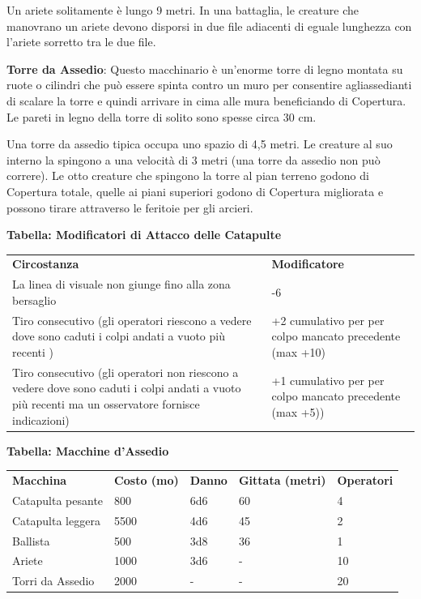 \documentclass[a4paper,11pt,twoside,openany]{book}
\begin{document}
{Un ariete solitamente è lungo 9 metri. In una battaglia, le creature che manovrano un ariete devono disporsi in due file adiacenti di eguale lunghezza con l'ariete sorretto tra le due file. 

\textbf{Torre da Assedio}: Questo macchinario è un'enorme torre di legno montata su ruote o cilindri che può essere spinta contro un muro per consentire agliassedianti di scalare la torre e quindi arrivare in cima alle mura beneficiando di Copertura. Le pareti in legno della torre di solito sono spesse circa 30 cm.

Una torre da assedio tipica occupa uno spazio di 4,5 metri. Le creature al suo interno la spingono a una velocità di 3 metri (una torre da assedio non può correre). Le otto creature che spingono la torre al pian terreno godono di Copertura totale, quelle ai piani superiori godono di Copertura migliorata e possono tirare attraverso le feritoie per gli arcieri.

\bigskip

\textbf{Tabella: Modificatori di Attacco delle Catapulte}

\begin{tabular}{L{10cm} L{6cm}} 
\toprule
\textbf{Circostanza} & \textbf{Modificatore}\tabularnewline
La linea di visuale non giunge fino alla zona bersaglio & -6\tabularnewline
Tiro consecutivo (gli operatori riescono a vedere dove sono caduti i colpi andati a vuoto più recenti ) &+2 cumulativo per per colpo  mancato precedente (max +10)\tabularnewline
Tiro consecutivo (gli operatori non riescono a vedere dove sono caduti i colpi andati a vuoto più recenti ma un osservatore fornisce indicazioni) & +1 cumulativo per per colpo mancato precedente (max +5))\tabularnewline
\end{tabular}

\bigskip

\textbf{Tabella: Macchine d'Assedio}

\medskip

\begin{tabular}{lllll}
\toprule
\textbf{Macchina} & \textbf{Costo (mo)} & \textbf{Danno} & \textbf{Gittata (metri)} & \textbf{Operatori}\tabularnewline
Catapulta pesante & 800 & 6d6 & 60 & 4\tabularnewline
Catapulta leggera & 5500 & 4d6 & 45 & 2\tabularnewline
Ballista & 500 & 3d8 & 36 & 1\tabularnewline
Ariete & 1000 & 3d6 & - & 10\tabularnewline
Torri da Assedio & 2000 & - & - & 20\tabularnewline
\end{tabular}

\bigskip

}
\end{document}
